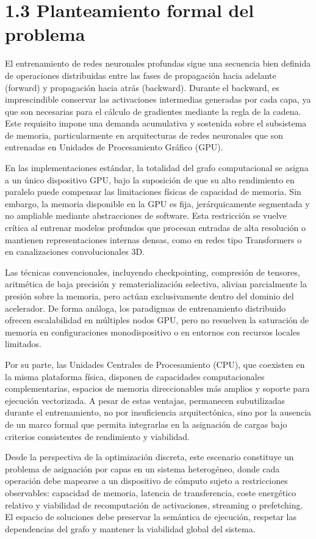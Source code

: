 \section{1.3 Planteamiento formal del problema}
El entrenamiento de redes neuronales profundas sigue una secuencia bien definida de operaciones distribuidas entre las fases de propagación hacia adelante (forward) y propagación hacia atrás (backward). Durante el backward, es imprescindible conservar las activaciones intermedias generadas por cada capa, ya que son necesarias para el cálculo de gradientes mediante la regla de la cadena. Este requisito impone una demanda acumulativa y sostenida sobre el subsistema de memoria, particularmente en arquitecturas de redes neuronales que son entrenadas en Unidades de Procesamiento Gráfico (GPU).

En las implementaciones estándar, la totalidad del grafo computacional se asigna a un único dispositivo GPU, bajo la suposición de que su alto rendimiento en paralelo puede compensar las limitaciones físicas de capacidad de memoria. Sin embargo, la memoria disponible en la GPU es fija, jerárquicamente segmentada y no ampliable mediante abstracciones de software. Esta restricción se vuelve crítica al entrenar modelos profundos que procesan entradas de alta resolución o mantienen representaciones internas densas, como en redes tipo Transformers o en canalizaciones convolucionales 3D.

Las técnicas convencionales, incluyendo checkpointing, compresión de tensores, aritmética de baja precisión y rematerialización selectiva, alivian parcialmente la presión sobre la memoria, pero actúan exclusivamente dentro del dominio del acelerador. De forma análoga, los paradigmas de entrenamiento distribuido ofrecen escalabilidad en múltiples nodos GPU, pero no resuelven la saturación de memoria en configuraciones monodispositivo o en entornos con recursos locales limitados.

Por su parte, las Unidades Centrales de Procesamiento (CPU), que coexisten en la misma plataforma física, disponen de capacidades computacionales complementarias, espacios de memoria direccionables más amplios y soporte para ejecución vectorizada. A pesar de estas ventajas, permanecen subutilizadas durante el entrenamiento, no por insuficiencia arquitectónica, sino por la ausencia de un marco formal que permita integrarlas en la asignación de cargas bajo criterios consistentes de rendimiento y viabilidad.

Desde la perspectiva de la optimización discreta, este escenario constituye un problema de asignación por capas en un sistema heterogéneo, donde cada operación debe mapearse a un dispositivo de cómputo sujeto a restricciones observables: capacidad de memoria, latencia de transferencia, coste energético relativo y viabilidad de recomputación de activaciones, streaming o prefetching. El espacio de soluciones debe preservar la semántica de ejecución, respetar las dependencias del grafo y mantener la viabilidad global del sistema.

